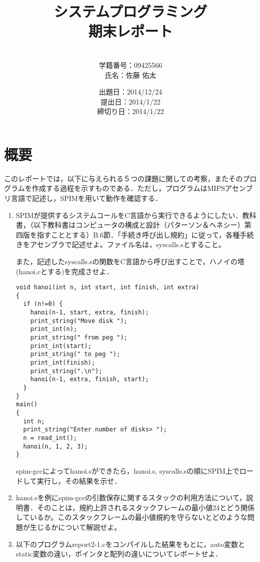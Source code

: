 \documentclass[a4j]{jarticle}
\title{システムプログラミング\\期末レポート}
\author{\\学籍番号：09425566\\氏名：佐藤 佑太}
\date{出題日：2014/12/24\\提出日：2014/1/22\\締切り日：2014/1/22\\}
\begin{document}
\maketitle

\newpage



%
%

\section{概要}

このレポートでは，以下に与えられる５つの課題に関しての考察，またそのプログラムを作成する過程を示すものである．ただし，プログラムはMIPSアセンブリ言語で記述し，SPIMを用いて動作を確認する．


\begin{enumerate}

\item SPIMが提供するシステムコールをC言語から実行できるようにしたい．教科書，（以下教科書はコンピュータの構成と設計（パターソン＆ヘネシー）第四版を指すこととする）B.6節．「手続き呼び出し規約」に従って，各種手続きをアセンブラで記述せよ。ファイル名は，syscalls.sとすること。　

また，記述したsyscalls.sの関数をC言語から呼び出すことで，ハノイの塔(hanoi.cとする)を完成させよ．

{\baselineskip 3mm
\begin{verbatim}
void hanoi(int n, int start, int finish, int extra)
{
  if (n!=0) {
    hanoi(n-1, start, extra, finish);
    print_string("Move disk ");
    print_int(n);
    print_string(" from peg ");
    print_int(start);
    print_string(" to peg ");
    print_int(finish);
    print_string(".\n");
    hanoi(n-1, extra, finish, start);
  }
}
main()
{
  int n;
  print_string("Enter number of disks> ");
  n = read_int();
  hanoi(n, 1, 2, 3);
}
\end{verbatim}
}

spim-gccによってhanoi.sができたら，hanoi.s, syscalls.sの順にSPIM上でロードして実行し，その結果を示せ．

\item hanoi.sを例にspim-gccの引数保存に関するスタックの利用方法について，説明書．そのことは，規約上許されるスタックフレームの最小値24とどう関係しているか。このスタックフレームの最小値規約を守らないとどのような問題が生じるかについて解説せよ。


\item 以下のプログラムreport2-1.cをコンパイルした結果をもとに，auto変数とstatic変数の違い，ポインタと配列の違いについてレポートせよ．


\end{enumerate}
\end{document}
